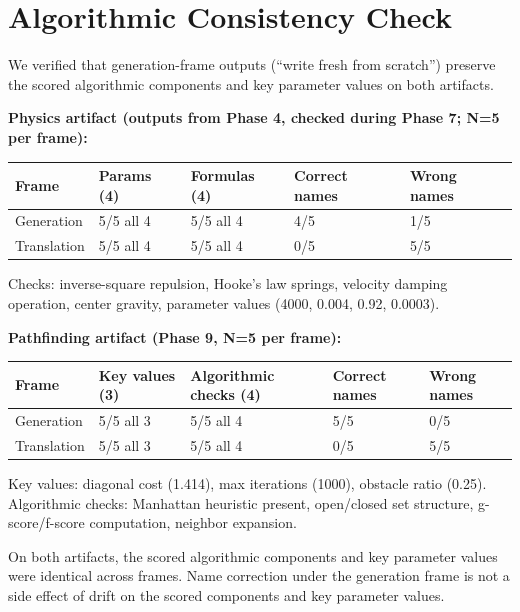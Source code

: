 \documentclass[11pt]{article}
\begin{document}
\section{Algorithmic Consistency Check}

We verified that generation-frame outputs (``write fresh from scratch'')
preserve the scored algorithmic components and key parameter values
on both artifacts.

\textbf{Physics artifact (outputs from Phase 4, checked during Phase 7; N=5 per frame):}

\begin{table}[ht]
\centering
\small
\begin{tabular}{@{}lllll@{}}
\toprule
Frame & Params (4) & Formulas (4) & Correct names & Wrong names \\
\midrule
Generation & 5/5 all 4 & 5/5 all 4 & 4/5 & 1/5 \\
Translation & 5/5 all 4 & 5/5 all 4 & 0/5 & 5/5 \\
\bottomrule
\end{tabular}
\end{table}

Checks: inverse-square repulsion, Hooke's law springs, velocity
damping operation, center gravity, parameter values (4000, 0.004,
0.92, 0.0003).

\textbf{Pathfinding artifact (Phase 9, N=5 per frame):}

\begin{table}[ht]
\centering
\small
\begin{tabular}{@{}lllll@{}}
\toprule
Frame & Key values (3) & Algorithmic checks (4) & Correct names & Wrong names \\
\midrule
Generation & 5/5 all 3 & 5/5 all 4 & 5/5 & 0/5 \\
Translation & 5/5 all 3 & 5/5 all 4 & 0/5 & 5/5 \\
\bottomrule
\end{tabular}
\end{table}

Key values: diagonal cost (1.414), max iterations (1000), obstacle
ratio (0.25). Algorithmic checks: Manhattan heuristic present,
open/closed set structure, g-score/f-score computation, neighbor
expansion.

On both artifacts, the scored algorithmic components and key parameter
values were identical across frames. Name correction under the
generation frame is not a side effect of drift on the scored
components and key parameter values.
\end{document}
